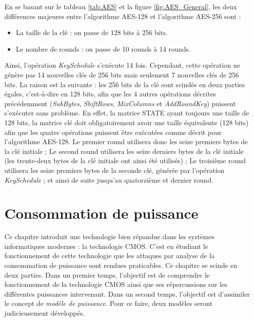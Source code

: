 \documentclass[oneside]{book}
\begin{document}
\vspace{0.1cm}En se basant sur le tableau \ref{tab:AES} et la figure \ref{fig:AES_General}, les deux différences majeures entre l'algorithme AES-128 et l'algorithme AES-256 sont :
\begin{itemize}
\item La taille de la clé : on passe de 128 bits à 256 bits.
\item Le nombre de rounds : on passe de 10 rounds à 14 rounds. \\
\end{itemize}
Ainsi, l'opération \textit{KeySchedule} s'exécute 14 fois. Cependant, cette opération ne génère pas 14 nouvelles clés de 256 bits mais seulement 7 nouvelles clés de 256 bits. La raison est la suivante : les 256 bits de la clé sont scindés en deux parties égales, c'est-à-dire en 128 bits, afin que les 4 autres opérations décrites précédemment (\textit{SubBytes}, \textit{ShiftRows}, \textit{MixColumns} et \textit{AddRoundKey}) puissent s'exécuter sans problème. En effet, la matrice STATE ayant toujours une taille de 128 bits, la matrice clé doit obligatoirement avoir une taille équivalente (128 bits) afin que les quatre opérations puissent être exécutées comme décrit pour l'algorithme AES-128. Le premier round utilisera donc les seize premiers bytes de la clé initiale ; Le second round utilisera les seize derniers bytes de la clé initiale (les trente-deux bytes de la clé initiale ont ainsi été utilisés) ; Le troisième round utilisera les seize premiers bytes de la seconde clé, générée par l'opération \textit{KeySchedule} ; et ainsi de suite jusqu'au quatorzième et dernier round.



\newpage


\chapter{Consommation de puissance}
\label{chap:puissance}

Ce chapitre introduit une technologie bien répandue dans les systèmes informatiques modernes : la technologie CMOS. C'est en étudiant le fonctionnement de cette technologie que les attaques par analyse de la consommation de puissance sont rendues praticables. Ce chapitre se scinde en deux parties. Dans un premier temps, l'objectif est de comprendre le fonctionnement de la technologie CMOS ainsi que ses répercussions sur les différentes puissances intervenant. Dans un second temps, l'objectif est d'assimiler le concept de \textit{modèle de puissance}. Pour ce faire, deux modèles seront judicieusement développés.
\end{document}
